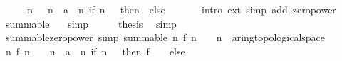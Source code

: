 \begin{isabellebody}
%
\isadelimproof
%
\endisadelimproof
%
\isatagproof
{}\isamarkupfalse%
\ {\isacharminus}{\kern0pt}\isanewline
\ \ \isamarkupfalse%
\ {\isachardoublequoteopen}{\isacharparenleft}{\kern0pt}{\isasymlambda}n{\isachardot}{\kern0pt}\ {}\ {\isacharcircum}{\kern0pt}\ n\ {\isacharcolon}{\kern0pt}{\isacharcolon}{\kern0pt}\ {\isacharprime}{\kern0pt}a{\isacharparenright}{\kern0pt}\ {\isacharequal}{\kern0pt}\ {\isacharparenleft}{\kern0pt}{\isasymlambda}n{\isachardot}{\kern0pt}\ if\ n\ {\isacharequal}{\kern0pt}\ {}\ then\ {}{\isacharcircum}{\kern0pt}{}\ else\ {}{\isacharparenright}{\kern0pt}{\isachardoublequoteclose}\isanewline
\ \ \ \ \isamarkupfalse%
\ {\isacharparenleft}{\kern0pt}intro\ ext{\isacharparenright}{\kern0pt}\ {\isacharparenleft}{\kern0pt}simp\ add{\isacharcolon}{\kern0pt}\ zero{\isacharunderscore}{\kern0pt}power{\isacharparenright}{\kern0pt}\isanewline
\ \ \isamarkupfalse%
\ \isamarkupfalse%
\ {\isachardoublequoteopen}summable\ {\isasymdots}{\isachardoublequoteclose}\ \isamarkupfalse%
\ simp\isanewline
\ \ \isamarkupfalse%
\ \isamarkupfalse%
\ {\isacharquery}{\kern0pt}thesis\ \isamarkupfalse%
\ simp\isanewline
{}\isamarkupfalse%
%
\endisatagproof
{\isafoldproof}%
%
\isadelimproof
\isanewline
%
\endisadelimproof
\isanewline
{}\isamarkupfalse%
\ summable{\isacharunderscore}{\kern0pt}zero{\isacharunderscore}{\kern0pt}power{\isacharprime}{\kern0pt}\ {\isacharbrackleft}{\kern0pt}simp{\isacharbrackright}{\kern0pt}{\isacharcolon}{\kern0pt}\ {\isachardoublequoteopen}summable\ {\isacharparenleft}{\kern0pt}{\isasymlambda}n{\isachardot}{\kern0pt}\ f\ n\ {\isacharasterisk}{\kern0pt}\ {}\ {\isacharcircum}{\kern0pt}\ n\ {\isacharcolon}{\kern0pt}{\isacharcolon}{\kern0pt}\ {\isacharprime}{\kern0pt}a{\isacharcolon}{\kern0pt}{\isacharcolon}{\kern0pt}{\isacharbraceleft}{\kern0pt}ring{\isacharunderscore}{\kern0pt}{}{\isacharcomma}{\kern0pt}topological{\isacharunderscore}{\kern0pt}space{\isacharbraceright}{\kern0pt}{\isacharparenright}{\kern0pt}{\isachardoublequoteclose}\isanewline
%
\isadelimproof
%
\endisadelimproof
%
\isatagproof
{}\isamarkupfalse%
\ {\isacharminus}{\kern0pt}\isanewline
\ \ \isamarkupfalse%
\ {\isachardoublequoteopen}{\isacharparenleft}{\kern0pt}{\isasymlambda}n{\isachardot}{\kern0pt}\ f\ n\ {\isacharasterisk}{\kern0pt}\ {}\ {\isacharcircum}{\kern0pt}\ n\ {\isacharcolon}{\kern0pt}{\isacharcolon}{\kern0pt}\ {\isacharprime}{\kern0pt}a{\isacharparenright}{\kern0pt}\ {\isacharequal}{\kern0pt}\ {\isacharparenleft}{\kern0pt}{\isasymlambda}n{\isachardot}{\kern0pt}\ if\ n\ {\isacharequal}{\kern0pt}\ {}\ then\ f\ {}\ {\isacharasterisk}{\kern0pt}\ {}{\isacharcircum}{\kern0pt}{}\ else\ {}{\isacharparenright}{\kern0pt}{\isachardoublequoteclose}\isanewline

\end{isabellebody}
